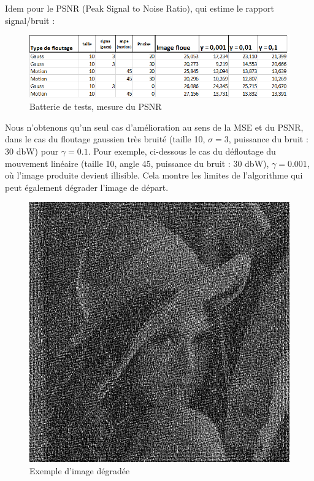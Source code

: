 \documentclass{article}
\begin{document}
	Idem pour le PSNR (Peak Signal to Noise Ratio), qui estime le rapport signal/bruit :
	
	\begin{figure}[!h]
		\begin{center}			
			\includegraphics[scale=0.4]{Img/tabpsnr}
		\end{center}
		\caption{Batterie de tests, mesure du PSNR}
	\end{figure}


	Nous n'obtenons qu'un seul cas d'amélioration au sens de la MSE et du PSNR, dans le cas du floutage gaussien très bruité (taille 10, $\sigma = 3$, puissance du bruit : 30 dbW) pour $\gamma = 0.1$.
	Pour exemple, ci-dessous le cas du défloutage du mouvement linéaire (taille 10, angle 45\degre, puissance du bruit : 30 dbW), $\gamma = 0.001$, où l'image produite devient illisible. Cela montre les limites de l'algorithme qui peut également dégrader l'image de départ.
	
	\begin{figure}[!h]
		\begin{center}			
			\includegraphics[scale=0.4]{Img/echec}
		\end{center}
		\caption{Exemple d'image dégradée}
	\end{figure}
	
\end{document}
